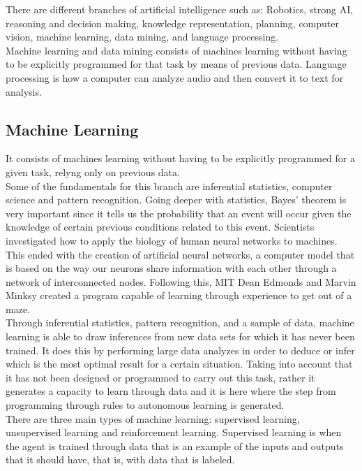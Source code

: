 \documentclass[sigconf,12pt,review=false,natbib=false]{acmart}
\begin{document}
There are different branches of artificial intelligence such as: Robotics, strong AI, reasoning and decision
making, knowledge representation, planning, computer vision, machine learning, data mining, and language
processing. \\

Machine learning and data mining consists of machines learning without having to be explicitly programmed for
that task by means of previous data. Language processing is how a computer can analyze audio and then convert it
to text for analysis. \\

\subsection{Machine Learning}

It consists of machines learning without having to be explicitly programmed for a given task, relyng only on
previous data. \\

Some of the fundamentals for this branch are inferential statistics, computer science and pattern recognition.
Going deeper with statistics, Bayes' theorem is very important since it tells us the probability that an event will
occur given the knowledge of certain previous conditions related to this event.
Scientists investigated how to apply the biology of human neural networks to machines. This ended with the creation
of artificial neural networks, a computer model that is based on the way our neurons share information with each other
through a network of interconnected nodes. Following this, MIT Dean Edmonds and Marvin Minksy created a program
capable of learning through experience to get out of a maze. \\

Through inferential statistics, pattern recognition, and a sample of data, machine learning is able to draw inferences
from new data sets for which it has never been trained. It does this by performing large data analyzes in order to
deduce or infer which is the most optimal result for a certain situation. Taking into account that it has not been
designed or programmed to carry out this task, rather it generates a capacity to learn through data and it is here
where the step from programming through rules to autonomous learning is generated. \\

There are three main types of machine learning: supervised learning, unsupervised learning and reinforcement learning.
Supervised learning is when the agent is trained through data that is an example of the inputs and outputs that it
should have, that is, with data that is labeled. \\
\end{document}
